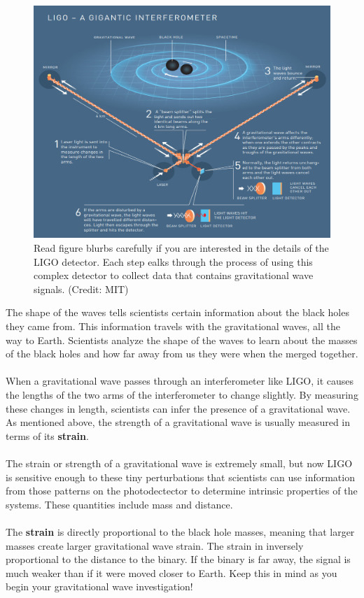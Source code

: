 \documentclass[14pt]{article}
\begin{document}
\begin{figure}[h]
    \centering
    \includegraphics[width=\textwidth]{ligo.jpeg}
    \caption{Read figure blurbs carefully if you are interested in the details of the LIGO detector. Each step ealks through the process of using this complex detector to collect data that contains gravitational wave signals. (Credit: MIT)}
    \label{fig:ligo}
\end{figure}

\noindent The shape of the waves tells scientists certain  information about the black holes they came from. This information travels with the gravitational waves, all the way to Earth. Scientists analyze the shape of the waves to learn about the masses of the black holes and how far away from us they were when the merged together.
\\\\
When a gravitational wave passes through an interferometer like LIGO, it causes the lengths of the two arms of the interferometer to change slightly. By measuring these changes in length, scientists can infer the presence of a gravitational wave. As mentioned above, the strength of a gravitational wave is usually measured in terms of its \textbf{strain}. 
\\\\
The strain or strength of a gravitational wave is extremely small, but now LIGO is sensitive enough to these tiny perturbations that scientists can use information from those patterns on the photodectector to determine intrinsic properties of the systems. These
quantities include mass and distance. 
\\\\
The \textbf{strain} is directly proportional to the black hole masses, meaning that larger masses create larger gravitational wave strain. The strain in inversely proportional to the distance to the binary. If the binary is far away, the signal is much weaker than if it were moved closer to Earth. Keep this in mind as you begin your gravitational wave investigation!
\end{document}
